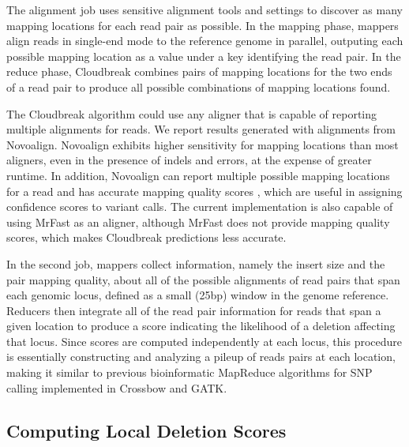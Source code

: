 \documentclass[12pt]{article}
\begin{document}
The alignment job uses sensitive alignment tools and settings to discover as many mapping locations for each read pair as possible. In the mapping phase, mappers align reads in single-end mode to the reference genome in parallel, outputing each possible mapping location as a value under a key identifying the read pair. In the reduce phase, Cloudbreak combines pairs of mapping locations for the two ends of a read pair to produce all possible combinations of mapping locations found. 

The Cloudbreak algorithm could use any aligner that is capable of reporting multiple alignments for reads. We report results generated with alignments from Novoalign. \cite{novoalign} Novoalign exhibits higher sensitivity for mapping locations than most aligners, even in the presence of indels and errors, at the expense of greater runtime. \cite{Krawitz:2010iq} In addition, Novoalign can report multiple possible mapping locations for a read and has accurate mapping quality scores \cite{Ruffalo:2011p1758}, which are useful in assigning confidence scores to variant calls. The current implementation is also capable of using MrFast \cite{Alkan:2009cr} as an aligner, although MrFast does not provide mapping quality scores, which makes Cloudbreak predictions less accurate.

In the second job, mappers collect information, namely the insert size and the pair mapping quality, about all of the possible alignments of read pairs that span each genomic locus, defined as a small (25bp) window in the genome reference. Reducers then integrate all of the read pair information for reads that span a given location to produce a score indicating the likelihood of a deletion affecting that locus. Since scores are computed independently at each locus, this procedure is essentially constructing and analyzing a pileup of reads pairs at each location, making it similar to previous bioinformatic MapReduce algorithms for SNP calling implemented in Crossbow \cite{Langmead:2009p1225} and GATK. \cite{McKenna:2010p1051}

\subsection{Computing Local Deletion Scores}
\end{document}
